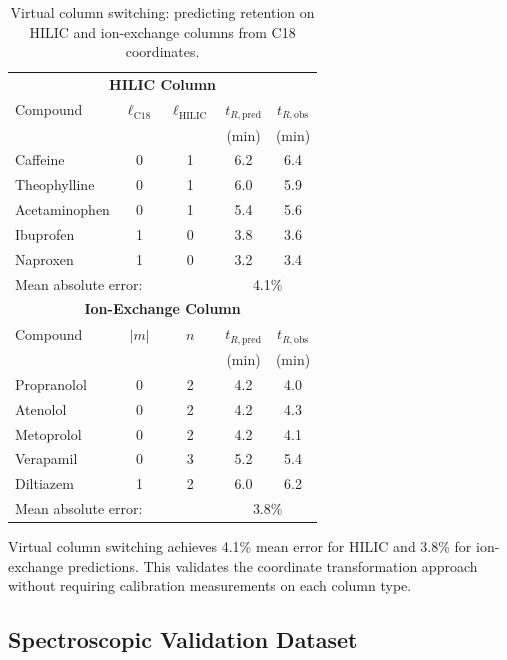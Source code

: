 \documentclass[twocolumn,superscriptaddress,prb,10pt]{revtex4-2}
\begin{document}
\begin{table}[htbp]
\centering
\caption{Virtual column switching: predicting retention on HILIC and ion-exchange columns from C18 coordinates.}
\label{tab:virtual_column}
\begin{ruledtabular}
\begin{tabular}{lcccc}
\multicolumn{5}{c}{\textbf{HILIC Column}} \\
Compound & $\ell_{\text{C18}}$ & $\ell_{\text{HILIC}}$ & $t_{R,\text{pred}}$ & $t_{R,\text{obs}}$ \\
         &                     &                       & (min) & (min) \\
\hline
Caffeine      & 0 & 1 & 6.2 & 6.4 \\
Theophylline  & 0 & 1 & 6.0 & 5.9 \\
Acetaminophen & 0 & 1 & 5.4 & 5.6 \\
Ibuprofen     & 1 & 0 & 3.8 & 3.6 \\
Naproxen      & 1 & 0 & 3.2 & 3.4 \\
\hline
\multicolumn{3}{l}{Mean absolute error:} & \multicolumn{2}{c}{4.1\%} \\
\hline
\multicolumn{5}{c}{\textbf{Ion-Exchange Column}} \\
Compound & $|m|$ & $n$ & $t_{R,\text{pred}}$ & $t_{R,\text{obs}}$ \\
         &       &     & (min) & (min) \\
\hline
Propranolol  & 0 & 2 & 4.2 & 4.0 \\
Atenolol     & 0 & 2 & 4.2 & 4.3 \\
Metoprolol   & 0 & 2 & 4.2 & 4.1 \\
Verapamil    & 0 & 3 & 5.2 & 5.4 \\
Diltiazem    & 1 & 2 & 6.0 & 6.2 \\
\hline
\multicolumn{3}{l}{Mean absolute error:} & \multicolumn{2}{c}{3.8\%} \\
\end{tabular}
\end{ruledtabular}
\end{table}

Virtual column switching achieves 4.1\% mean error for HILIC and 3.8\% for ion-exchange predictions. This validates the coordinate transformation approach without requiring calibration measurements on each column type.

\subsection{Spectroscopic Validation Dataset}
\end{document}
